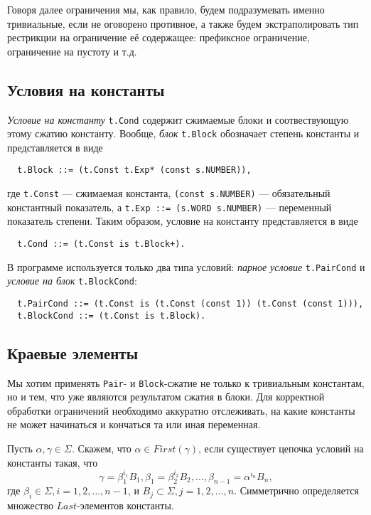 \documentclass[12pt]{article}
\begin{document}
Говоря далее ограничения мы, как правило, будем подразумевать именно
тривиальные, если не оговорено противное, а также будем экстраполировать
тип рестрикции на ограничение её содержащее: префиксное ограничение,
ограничение на пустоту и т.д.

\subsection{Условия на константы}

\textit{Условие на константу} \texttt{t.Cond} содержит сжимаемые блоки и
соотвествующую этому сжатию константу. Вообще, \textit{блок} \texttt{t.Block}
обозначает степень константы и представляется в виде
\begin{Verbatim}
  t.Block ::= (t.Const t.Exp* (const s.NUMBER)),
\end{Verbatim}
где \texttt{t.Const} --- сжимаемая константа, \texttt{(const s.NUMBER)} ---
обязательный константный показатель, а \texttt{t.Exp ::= (s.WORD s.NUMBER)}
--- переменный показатель степени. Таким образом, условие на константу
представляется в виде
\begin{Verbatim}
  t.Cond ::= (t.Const is t.Block+).
\end{Verbatim}
В программе используется только два типа условий: \textit{парное условие}
\texttt{t.PairCond} и \textit{условие на блок} \texttt{t.BlockCond}:
\begin{Verbatim}
  t.PairCond ::= (t.Const is (t.Const (const 1)) (t.Const (const 1))),
  t.BlockCond ::= (t.Const is t.Block).
\end{Verbatim}

\subsection{Краевые элементы}

Мы хотим применять \texttt{Pair}- и \texttt{Block}-сжатие не только к
тривиальным константам, но и тем, что уже являются результатом сжатия в блоки.
Для корректной обработки ограничений необходимо аккуратно отслеживать, на какие
константы не может начинаться и кончаться та или иная переменная.

Пусть $\alpha, \gamma \in \Sigma$. Скажем, что $\alpha \in First(\gamma)$, если
существует цепочка условий на константы такая, что
\begin{displaymath}
  \gamma = \beta_1^{i_1} B_1,
  \beta_1 = \beta_2^{i_2} B_2,
  \dots,
  \beta_{n-1} = \alpha^{i_n} B_n,
\end{displaymath}
где $\beta_i \in \Sigma, i = 1, 2, \dots, n - 1$, и $B_j \subset \Sigma, j = 1,
2, \dots, n$. Симметрично определяется множество $Last$-элементов константы.
\end{document}
